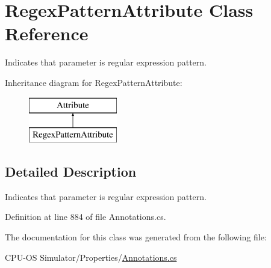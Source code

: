 \hypertarget{class_regex_pattern_attribute}{}\section{Regex\+Pattern\+Attribute Class Reference}
\label{class_regex_pattern_attribute}


Indicates that parameter is regular expression pattern.  


Inheritance diagram for Regex\+Pattern\+Attribute\+:\begin{figure}[H]
\begin{center}
\leavevmode
\includegraphics[height=2.000000cm]{class_regex_pattern_attribute}
\end{center}
\end{figure}


\subsection{Detailed Description}
Indicates that parameter is regular expression pattern. 



Definition at line 884 of file Annotations.\+cs.



The documentation for this class was generated from the following file\+:\begin{DoxyCompactItemize}
\item 
C\+P\+U-\/\+O\+S Simulator/\+Properties/\hyperlink{_annotations_8cs}{Annotations.\+cs}\end{DoxyCompactItemize}
